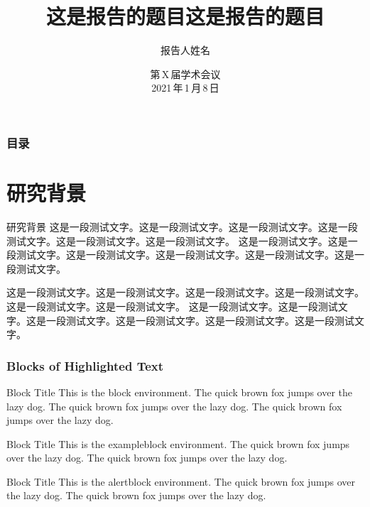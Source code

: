 \documentclass[notheorems,11pt,compress]{beamer}
\title[报告题目]{这是报告的题目这是报告的题目}
\author[姓名]{报告人姓名}
\institute[XX大学]{\vskip -10pt
	\small \textcolor{blue}{XX大学数学系}
	\vskip 10pt
}
\date[2021\,年\,1\,月\,8\,日]{第\,X\,届学术会议 \\[5pt] 2021\,年\,1\,月\,8\,日}
\numberwithin{figure}{section}
\numberwithin{table}{section}
\numberwithin{equation}{section}
\theoremstyle{plain}
\numberwithin{theorem}{section}
\numberwithin{definition}{section}
\numberwithin{lemma}{section}
\numberwithin{proposition}{section}
\numberwithin{corollary}{section}
\theoremstyle{example}
\begin{document}
\setlength{\baselineskip}{15pt}


{%
	\begin{frame}
		\titlepage %
	\end{frame}}


\begin{frame}
	\frametitle{目录}
	\tableofcontents
\end{frame}



\section{研究背景}

\begin{frame}{研究背景}
	这是一段测试文字。这是一段测试文字。这是一段测试文字。这是一段测试文字。这是一段测试文字。这是一段测试文字。
	这是一段测试文字。这是一段测试文字。这是一段测试文字。这是一段测试文字。这是一段测试文字。这是一段测试文字。

	\vspace{1ex}
	这是一段测试文字。这是一段测试文字。这是一段测试文字。这是一段测试文字。这是一段测试文字。这是一段测试文字。
	这是一段测试文字。这是一段测试文字。这是一段测试文字。这是一段测试文字。这是一段测试文字。这是一段测试文字。

\end{frame}


\begin{frame}
	\frametitle{Blocks of Highlighted Text}
	\begin{block}{Block Title}
		This is the block environment. The quick brown fox jumps over the lazy dog. The quick brown fox jumps over the lazy dog. The quick brown fox jumps over the lazy dog.
	\end{block}

	\begin{exampleblock}{Block Title}
		This is the exampleblock environment. The quick brown fox jumps over the lazy dog. The quick brown fox jumps over the lazy dog.
	\end{exampleblock}

	\begin{alertblock}{Block Title}
		This is the alertblock environment. The quick brown fox jumps over the lazy dog. The quick brown fox jumps over the lazy dog.
	\end{alertblock}
\end{frame}
\end{document}
